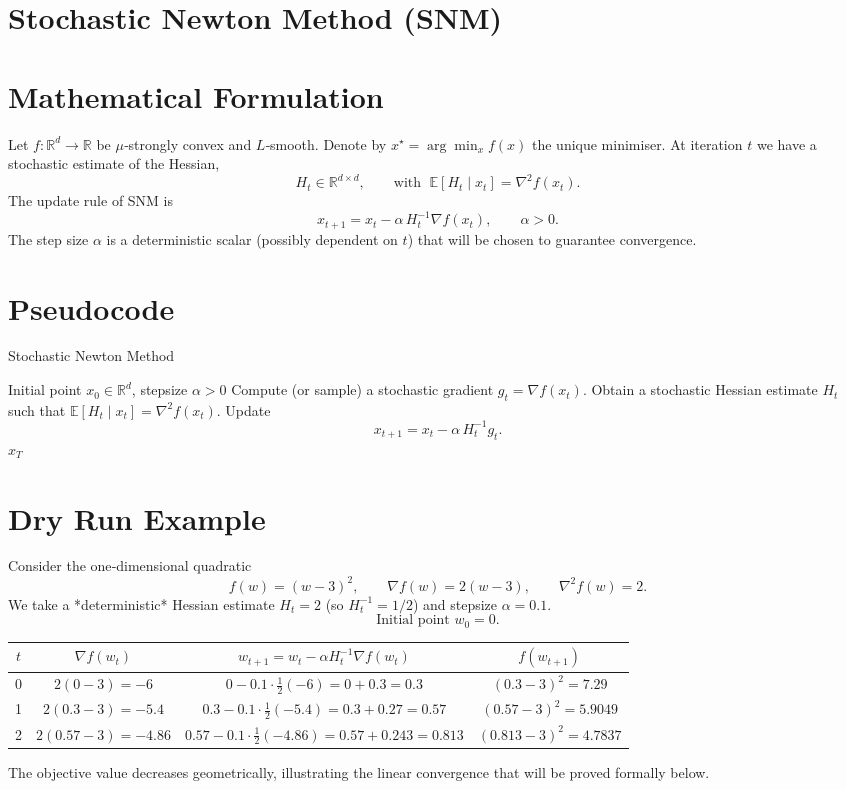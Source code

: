 \documentclass{article}
\newcommand{\E}{\mathbb{E}}
\newcommand{\R}{\mathbb{R}}
\begin{document}
\section*{Stochastic Newton Method (SNM)}

\section*{Mathematical Formulation}
Let $f:\R^{d}\rightarrow\R$ be $\mu$‑strongly convex and $L$‑smooth.  
Denote by $x^{\star}=\arg\min_{x}f(x)$ the unique minimiser.  
At iteration $t$ we have a stochastic estimate of the Hessian,
\[
H_{t}\in\R^{d\times d},
\qquad 
\text{with } \; \E[H_{t}\mid x_{t}]=\nabla^{2}f(x_{t}) .
\]
The update rule of SNM is
\begin{equation}\label{eq:update}
x_{t+1}=x_{t}-\alpha\,H_{t}^{-1}\nabla f(x_{t}),\qquad  \alpha>0.
\end{equation}
The step size $\alpha$ is a deterministic scalar (possibly dependent on $t$) that will be chosen to guarantee convergence.

\section*{Pseudocode}
\begin{algorithm}[H]
\caption{Stochastic Newton Method}
\begin{algorithmic}[1]
\REQUIRE Initial point $x_{0}\in\R^{d}$, stepsize $\alpha>0$
    \STATE Compute (or sample) a stochastic gradient $g_{t}=\nabla f(x_{t})$.
    \STATE Obtain a stochastic Hessian estimate $H_{t}$ such that
          $\E[H_{t}\mid x_{t}]=\nabla^{2}f(x_{t})$.
    \STATE Update 
    \[
    x_{t+1}=x_{t}-\alpha\,H_{t}^{-1}g_{t}.
    \]
\ENDFOR
\RETURN $x_{T}$
\end{algorithmic}
\end{algorithm}

\section*{Dry Run Example}
Consider the one‑dimensional quadratic
\[
f(w)=(w-3)^{2},\qquad \nabla f(w)=2(w-3),\qquad \nabla^{2}f(w)=2 .
\]
We take a *deterministic* Hessian estimate $H_{t}=2$ (so $H_{t}^{-1}=1/2$) and stepsize $\alpha=0.1$.
\[
\text{Initial point } w_{0}=0.
\]

\begin{center}
\begin{tabular}{c|c|c|c}
$t$ & $\nabla f(w_{t})$ & $w_{t+1}=w_{t}-\alpha H_{t}^{-1}\nabla f(w_{t})$ & $f(w_{t+1})$\\ \hline
0 & $2(0-3)=-6$ & $0-0.1\cdot\frac{1}{2}(-6)=0+0.3=0.3$ & $(0.3-3)^{2}=7.29$\\
1 & $2(0.3-3)=-5.4$ & $0.3-0.1\cdot\frac{1}{2}(-5.4)=0.3+0.27=0.57$ & $(0.57-3)^{2}=5.9049$\\
2 & $2(0.57-3)=-4.86$ & $0.57-0.1\cdot\frac{1}{2}(-4.86)=0.57+0.243=0.813$ & $(0.813-3)^{2}=4.7837$\\
\end{tabular}
\end{center}
The objective value decreases geometrically, illustrating the linear convergence that will be proved formally below.
\end{document}
